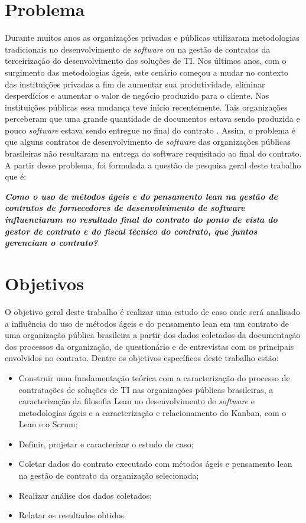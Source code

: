\section[Problema]{Problema}

Durante muitos anos as organizações privadas e públicas utilizaram metodologias tradicionais no desenvolvimento de \textit{software} ou na gestão de contratos da terceirização do desenvolvimento das soluções de TI. Nos últimos anos, com o surgimento das metodologias ágeis, este cenário começou a mudar no contexto das instituições privadas a fim de aumentar sua produtividade, eliminar desperdícios e aumentar o valor de negócio produzido para o cliente. Nas instituições públicas essa mudança teve início recentemente. Tais organizações perceberam que uma grande quantidade de documentos estava sendo produzida e pouco \textit{software} estava sendo entregue no final do contrato \cite{TCU:2013}. Assim, o problema é que alguns contratos de desenvolvimento de \textit{software} das organizações públicas brasileiras não resultaram na entrega do software requisitado ao final do contrato. A partir desse problema, foi formulada a questão de pesquisa geral deste trabalho que é:

\textit{\textbf {Como o uso de métodos ágeis e do pensamento lean na gestão de contratos de fornecedores de desenvolvimento de software influenciaram no resultado final do contrato do ponto de vista do gestor de contrato e do fiscal técnico do contrato, que juntos gerenciam o contrato?
}}

\section[Objetivos]{Objetivos}

O objetivo geral deste trabalho é realizar uma estudo de caso onde será analisado a influência do uso de métodos ágeis e do pensamento lean em um contrato de uma organização pública brasileira a partir dos dados coletados da documentação dos processos da organização, de questionário e de entrevistas com os principais envolvidos no contrato. Dentre os objetivos específicos deste trabalho estão:

\begin{itemize}
\item Construir uma fundamentação teórica com a caracterização do processo de contratações de soluções de TI nas organizações públicas brasileiras, a caracterização da filosofia Lean no desenvolvimento de \textit{software} e metodologias ágeis e a caracterização e relacionamento do Kanban, com o Lean e o Scrum;
\item Definir, projetar e caracterizar o estudo de caso;
\item Coletar dados do contrato executado com métodos ágeis e pensamento lean na gestão de contrato da organização selecionada;
\item Realizar análise dos dados coletados;
\item Relatar os resultados obtidos.
\end{itemize}

